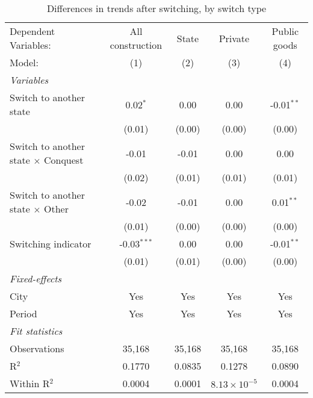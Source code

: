 \begin{table}[htbp]
   \caption{\label{tab:window_10y} Differences in trends after switching, by switch type}
   \centering
   \begin{tabular}{lcccc}
      \tabularnewline \midrule \midrule
      Dependent Variables:                       & All construction & State  & Private               & Public goods\\  
      Model:                                     & (1)              & (2)    & (3)                   & (4)\\  
      \midrule
      \emph{Variables}\\
      Switch to another state                    & 0.02$^{*}$       & 0.00   & 0.00                  & -0.01$^{**}$\\   
                                                 & (0.01)           & (0.00) & (0.00)                & (0.00)\\   
      Switch to another state $\times$ Conquest  & -0.01            & -0.01  & 0.00                  & 0.00\\   
                                                 & (0.02)           & (0.01) & (0.01)                & (0.01)\\   
      Switch to another state $\times$ Other     & -0.02            & -0.01  & 0.00                  & 0.01$^{**}$\\   
                                                 & (0.01)           & (0.00) & (0.00)                & (0.00)\\   
      Switching indicator                        & -0.03$^{***}$    & 0.00   & 0.00                  & -0.01$^{**}$\\   
                                                 & (0.01)           & (0.01) & (0.00)                & (0.00)\\   
      \midrule
      \emph{Fixed-effects}\\
      City                                       & Yes              & Yes    & Yes                   & Yes\\  
      Period                                     & Yes              & Yes    & Yes                   & Yes\\  
      \midrule
      \emph{Fit statistics}\\
      Observations                               & 35,168           & 35,168 & 35,168                & 35,168\\  
      R$^2$                                      & 0.1770           & 0.0835 & 0.1278                & 0.0890\\  
      Within R$^2$                               & 0.0004           & 0.0001 & $8.13\times 10^{-5}$  & 0.0004\\  
      \midrule \midrule
      

\end{tabular}
\end{table}
